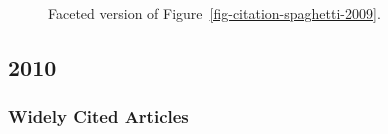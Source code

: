 \documentclass[
  10pt,
  letterpaper,
  DIV=11,
  numbers=noendperiod,
  twoside]{scrartcl}
\begin{document}
\begin{figure}


\caption{\label{fig-citation-facet-2009}Faceted version of
Figure~\ref{fig-citation-spaghetti-2009}.}

\end{figure}%

\newpage

\subsection{2010}\label{sec-s2010}

\subsubsection*{Widely Cited Articles}\label{widely-cited-articles-54}
\end{document}
